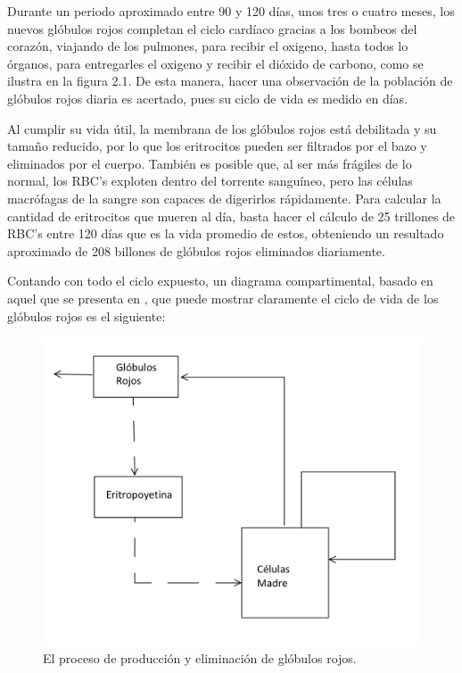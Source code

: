 Durante un periodo aproximado entre 90 y 120 días, unos tres o cuatro meses, los nuevos glóbulos rojos completan el ciclo cardíaco gracias a los bombeos del corazón, viajando de los pulmones, para recibir el oxigeno, hasta todos lo órganos, para entregarles el oxigeno y recibir el dióxido de carbono, como se ilustra en la figura 2.1. De esta manera, hacer una observación de la población de glóbulos rojos diaria es acertado, pues su ciclo de vida es medido en días.

Al cumplir su vida útil, la membrana de los glóbulos rojos está debilitada y su tamaño reducido, por lo que los eritrocitos pueden ser filtrados por el bazo y eliminados por el cuerpo. También es posible que, al ser más frágiles de lo normal, los RBC's exploten dentro del torrente sanguíneo, pero las células macrófagas de la sangre son capaces de digerirlos rápidamente. Para calcular la cantidad de eritrocitos que mueren al día, basta hacer el cálculo de 25 trillones de RBC's entre 120 días que es la vida promedio de estos, obteniendo un resultado aproximado de 208 billones de glóbulos rojos eliminados diariamente.

Contando con todo el ciclo expuesto, un diagrama compartimental, basado en aquel que se presenta en \cite{kirk1968mathematical}, que puede mostrar claramente el ciclo de vida de los glóbulos rojos es el siguiente:

\begin{figure}[H]
    \centering
    \includegraphics[scale=0.3]{figures/VidaRBC.jpeg}
    \caption{El proceso de producción y eliminación de glóbulos rojos.}
    \label{sec:RBC:fig:VidaRBC}
\end{figure}

